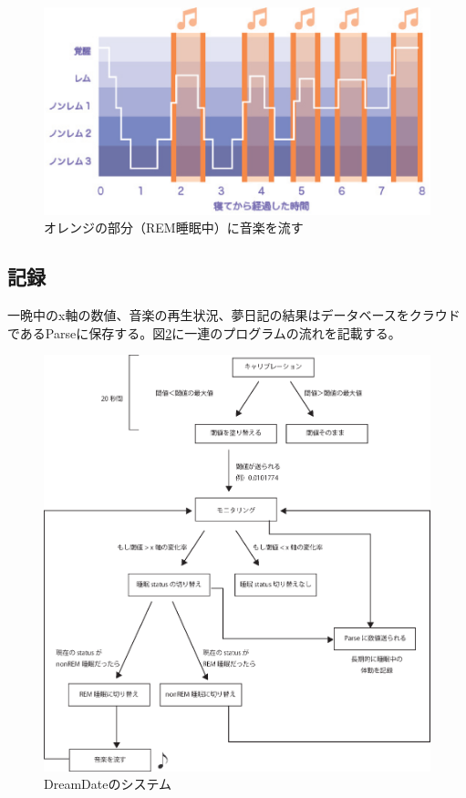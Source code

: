 \begin{figure}[htbp]
\begin{center}
\includegraphics[width=15cm]{eps/remNonrem.eps}
\caption{オレンジの部分（REM睡眠中）に音楽を流す}
\label{melodyGraph}
\end{center}
\end{figure}


\subsection{記録}
一晩中のx軸の数値、音楽の再生状況、夢日記の結果はデータベースをクラウドであるParseに保存する。図\ref{system}に一連のプログラムの流れを記載する。

\begin{figure}[htbp]
\begin{center}
\includegraphics[width=12cm]{eps/system.eps}
\caption{DreamDateのシステム}
\label{system}
\end{center}
\end{figure}